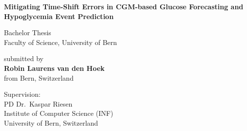 \thispagestyle{empty}

\newcommand{\thesistitle}{Mitigating Time-Shift Errors in CGM-based Glucose Forecasting and Hypoglycemia Event Prediction}
\newcommand{\thesisauthor}{Robin Laurens van den Hoek}
\newcommand{\thesisauthororigin}{[City of birth, Country]}
\newcommand{\supervisor}{PD Dr.~Kaspar Riesen}

\vfill
\begin{titlepage}
\begin{center}
\LARGE
{\bf \thesistitle}\\[1.5em]
\vspace*{2.5cm}

Bachelor Thesis\\
Faculty of Science, University of Bern

\vfill\vfill\vfill

submitted by \\ \vspace*{0.2cm}
{\bf \thesisauthor} \\ \vspace*{0.2cm}
from Bern, Switzerland

\vfill\vfill\vfill\vfill\vfill\vfill\vfill

Supervision:\\[5pt]
\supervisor\\
Institute of Computer Science (INF)\\
University of Bern, Switzerland

\end{center}
\end{titlepage}
